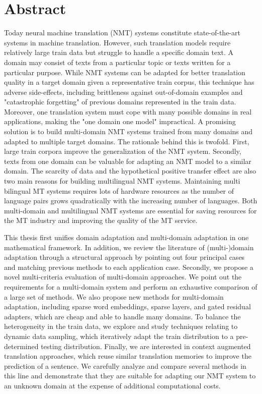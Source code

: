 \chapter*{Abstract}
Today neural machine translation (NMT) systems constitute state-of-the-art systems in machine translation. However, such translation models require relatively large train data but struggle to handle a specific domain text. A domain may consist of texts from a particular topic or texts written for a particular purpose. While NMT systems can be adapted for better translation quality in a target domain given a representative train corpus, this technique has adverse side-effects, including brittleness against out-of-domain examples and "catastrophic forgetting" of previous domains represented in the train data. Moreover, one translation system must cope with many possible domains in real applications, making the "one domain one model" impractical. A promising solution is to build multi-domain NMT systems trained from many domains and adapted to multiple target domains. The rationale behind this is twofold. First, large train corpora improve the generalization of the NMT system. Secondly, texts from one domain can be valuable for adapting an NMT model to a similar domain. The scarcity of data and the hypothetical positive transfer effect are also two main reasons for building multilingual NMT systems. Maintaining multi bilingual MT systems requires lots of hardware resources as the number of language pairs grows quadratically with the increasing number of languages. Both multi-domain and multilingual NMT systems are essential for saving resources for the MT industry and improving the quality of the MT service.

This thesis first unifies domain adaptation and multi-domain adaptation in one mathematical framework. In addition, we review the literature of (multi-)domain adaptation through a structural approach by pointing out four principal cases and matching previous methods to each application case. Secondly, we propose a novel multi-criteria evaluation of multi-domain approaches. We point out the requirements for a multi-domain system and perform an exhaustive comparison of a large set of methods. We also propose new methods for multi-domain adaptation, including sparse word embeddings, sparse layers, and gated residual adapters, which are cheap and able to handle many domains. To balance the heterogeneity in the train data, we explore and study techniques relating to dynamic data sampling, which iteratively adapt the train distribution to a pre-determined testing distribution. Finally, we are interested in context augmented translation approaches, which reuse similar translation memories to improve the prediction of a sentence. We carefully analyze and compare several methods in this line and demonstrate that they are suitable for adapting our NMT system to an unknown domain at the expense of additional computational costs.


